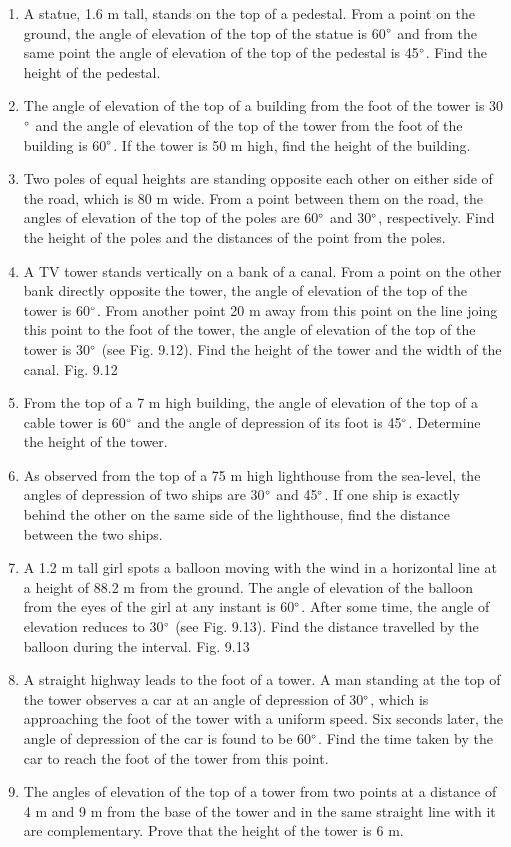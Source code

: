 \begin{enumerate}[label=\arabic*.,ref=\thesubsection.\theenumi]
\item A statue, 1.6 m tall, stands on the top of a pedestal. From a point on the ground, the angle of elevation of the top of the statue is 60$\degree$ and from the same point the angle of elevation of the top of the pedestal is 45$\degree$. Find the height of the pedestal.
\item The angle of elevation of the top of a building from the foot of the tower is 30$\degree$ and the angle of elevation of the top of the tower from the foot of the building is 60$\degree$. If the tower is 50 m high, find the height of the building.
\item Two poles of equal heights are standing opposite each other on either side of the road, which is 80 m wide. From a point between them on the road, the angles of elevation of the top of the poles are 60$\degree$ and 30$\degree$, respectively. Find the height of the poles and the distances of the point from the poles.
\item A TV tower stands vertically on a bank of a canal. From a point on the other bank directly opposite the tower, the angle of elevation of the top of the tower is 60$\degree$. From another point 20 m away from this point on the line joing this point to the foot of the tower, the angle of elevation of the top of the tower is 30$\degree$ (see Fig. 9.12). Find the height of the tower and the width of the canal.
Fig. 9.12
\item From the top of a 7 m high building, the angle of elevation of the top of a cable tower is 60$\degree$ and the angle of depression of its foot is 45$\degree$. Determine the height of the tower.
\item As observed from the top of a 75 m high lighthouse from the sea-level, the angles of depression of two ships are 30$\degree$ and 45$\degree$. If one ship is exactly behind the other on the same side of the lighthouse, find the distance between the two ships.
\item A 1.2 m tall girl spots a balloon moving with the wind in a horizontal line at a height of 88.2 m from the ground. The angle of elevation of the balloon from the eyes of the girl at any instant is 60$\degree$. After some time, the angle of elevation reduces to 30$\degree$ (see Fig. 9.13). Find the distance travelled by the balloon during the interval.
Fig. 9.13
\item A straight highway leads to the foot of a tower. A man standing at the top of the tower observes a car at an angle of depression of 30$\degree$, which is approaching the foot of the tower with a uniform speed. Six seconds later, the angle of depression of the car is found to be 60$\degree$. Find the time taken by the car to reach the foot of the tower from this point.
\item The angles of elevation of the top of a tower from two points at a distance of 4 m and 9 m from the base of the tower and in the same straight line with it are complementary. Prove that the height of the tower is 6 m.

\end{enumerate}
%

